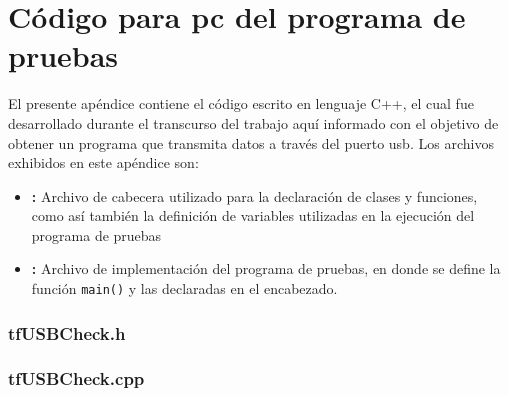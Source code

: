 \chapter{Código para \acrshort{pc} del programa de pruebas}
	\label{ap:cpp}
	El presente apéndice contiene el código escrito en lenguaje C++, el cual fue desarrollado durante el transcurso del trabajo aquí informado con el objetivo de obtener un programa que transmita datos a través del puerto \acrshort{usb}.
	Los archivos exhibidos en este apéndice son:
	
	\begin{itemize}
		\item \textbf{:} Archivo de cabecera utilizado para la declaración de clases y funciones, como así también la definición de variables utilizadas en la ejecución del programa de pruebas
		
		\item \textbf{:} Archivo de implementación del programa de pruebas, en donde se define la función \verb|main()| y las declaradas en el encabezado.
	\end{itemize}

	\subsection*{tfUSBCheck.h}
		\label{ap:cpp:head}
			
	\subsection*{tfUSBCheck.cpp}
		\label{ap:cpp:impl}
			